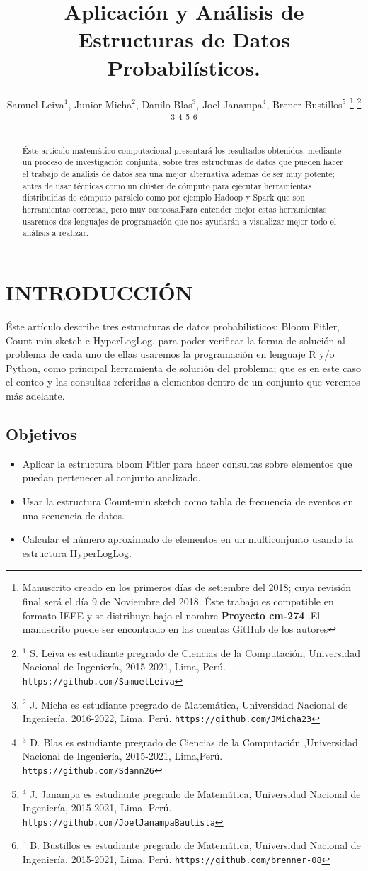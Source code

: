 \documentclass[journal]{IEEEtran}
\title{\LARGE \bf Aplicaci\'on y Análisis de Estructuras de Datos Probabil\'isticos. 
}
\author{Samuel Leiva$^{1}$, Junior Micha$^{2}$, Danilo Blas$^{3}$, Joel Janampa$^{4}$, Brener Bustillos$^{5}$%
\thanks{Manuscrito creado en los primeros d\'ias de setiembre del 2018; cuya revisi\'on final ser\'a el d\'ia 9 de Noviembre del 2018. \'Este trabajo es compatible en formato IEEE y se distribuye bajo el nombre \textbf{Proyecto cm-274} .El manuscrito puede ser encontrado en las cuentas GitHub de los autores}%
\thanks{$^{1}$ S. Leiva es estudiante pregrado de Ciencias de la Computaci\'on, Universidad Nacional de Ingenier\'ia, 2015-2021, Lima, Per\'u.
        {\tt\small https://github.com/SamuelLeiva}}%
\thanks{$^{2}$ J. Micha es estudiante pregrado de Matem\'atica, Universidad Nacional de Ingenier\'ia, 2016-2022, Lima, Per\'u.
        {\tt\small https://github.com/JMicha23}}%
\thanks{$^{3}$ D. Blas es estudiante pregrado de Ciencias de la Computaci\'on ,Universidad Nacional de Ingenier\'ia, 2015-2021, Lima,Per\'u.
        {\tt\small https://github.com/Sdann26}}%
\thanks{$^{4}$ J. Janampa es estudiante pregrado de Matem\'atica, Universidad Nacional de Ingenier\'ia, 2015-2021, Lima, Per\'u.
        {\tt\small https://github.com/JoelJanampaBautista}}%
\thanks{$^{5}$ B. Bustillos es estudiante pregrado de Matem\'atica, Universidad Nacional de Ingenier\'ia, 2015-2021, Lima, Per\'u. 
        {\tt\small https://github.com/brenner-08}}%
}
\begin{document}
\maketitle
\thispagestyle{empty}
\pagestyle{empty}


\begin{abstract}
   
\'Este art\'iculo matem\'atico-computacional presentar\'a los resultados obtenidos, mediante un proceso de investigaci\'on conjunta, sobre tres estructuras de datos que pueden hacer el trabajo de an\'alisis de datos sea una mejor alternativa ademas de ser muy potente; antes de usar t\'ecnicas como un cl\'uster de c\'omputo para ejecutar herramientas distribuidas de c\'omputo paralelo como por ejemplo  Hadoop y Spark que son herramientas correctas, pero muy costosas.Para entender mejor estas herramientas usaremos dos lenguajes de programaci\'on que nos ayudar\'an a visualizar mejor todo el an\'alisis a realizar. 

\end{abstract}


\section{INTRODUCCI\'ON}

\'Este art\'iculo describe tres estructuras de datos probabil\'isticos: Bloom Fitler, Count-min sketch e HyperLogLog. para poder verificar la forma de soluci\'on al problema de cada uno de ellas usaremos la programaci\'on en lenguaje R y/o Python, como principal herramienta de soluci\'on del problema; que es en este caso el conteo y las consultas referidas a elementos dentro de un conjunto que veremos m\'as adelante.

\subsection{Objetivos}

\begin{itemize}
    \item Aplicar la estructura bloom Fitler para hacer consultas sobre elementos que puedan pertenecer al conjunto analizado. 
    \item Usar la estructura Count-min sketch como tabla de frecuencia de eventos en una secuencia de datos.
    \item Calcular el número aproximado de elementos en un multiconjunto usando la estructura HyperLogLog.\\ 
\end{itemize}
\end{document}
